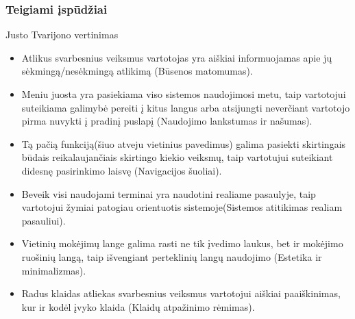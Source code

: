 \documentclass[oneside]{VUMIFPSkursinis}
\begin{document}
\subsubsection{Teigiami įspūdžiai}
Justo Tvarijono vertinimas
\begin{itemize}
	\item Atlikus svarbesnius veiksmus vartotojas yra aiškiai informuojamas apie jų sėkmingą/nesėkmingą atlikimą (Būsenos matomumas).
	\item Meniu juosta yra pasiekiama viso sistemos naudojimosi metu, taip vartotojui suteikiama galimybė pereiti į kitus langus arba atsijungti neverčiant vartotojo pirma nuvykti į pradinį puslapį (Naudojimo lankstumas ir našumas).
	\item Tą pačią funkciją(šiuo atveju vietinius pavedimus) galima pasiekti skirtingais būdais reikalaujančiais skirtingo kiekio veiksmų, taip vartotujui suteikiant didesnę pasirinkimo laisvę (Navigacijos šuoliai).
	\item Beveik visi naudojami terminai yra naudotini realiame pasaulyje, taip vartotojui žymiai patogiau orientuotis sistemoje(Sistemos atitikimas realiam pasauliui).
	\item Vietinių mokėjimų lange galima rasti ne tik įvedimo laukus, bet ir mokėjimo ruošinių langą, taip išvengiant perteklinių langų naudojimo (Estetika ir minimalizmas).
	\item Radus klaidas atliekas svarbesnius veiksmus vartotojui aiškiai paaiškinimas, kur ir kodėl įvyko klaida (Klaidų atpažinimo rėmimas).
\end{itemize}
\end{document}
